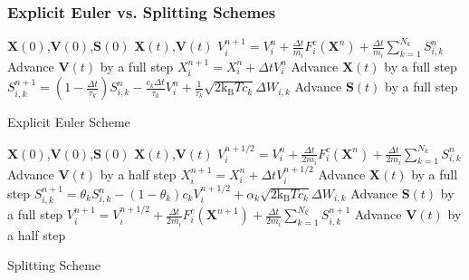 \documentclass[a4paper,10pt]{beamer}
\newcommand{\BS}[1]{\boldsymbol{#1}}
\newcommand{\rb}[1]{\left( #1 \right)}
\begin{document}
	\begin{frame}
		\frametitle{Explicit Euler vs. Splitting Schemes}
			\vspace{-0.3cm}
			\begin{algorithm}[H]
				\scriptsize
				\renewcommand{\algorithmicrequire}{\textbf{Input:}}
				\renewcommand{\algorithmicensure}{\textbf{Output:}}
				\begin{algorithmic}[1]
					\Require $\BS{X}(0)$,$\BS{V}(0)$,$\BS{S}(0)$
					\Ensure $\BS{X}(t)$,$\BS{V}(t)$
					\tiny
						\State $V_{i}^{n+1} = V_{i}^{n} + \frac{\Delta t}{m_{i}} F_{i}^{c} \rb{\BS{X}^{n}}+\frac{\Delta t}{m_{i}} \sum_{k=1}^{N_{k}}S_{i,k}^{n}$
						\Comment Advance $\BS{V}(t)$ by a full step
						\State $X_{i}^{n+1} = X_{i}^{n} + \Delta t V_{i}^{n}$
						\Comment Advance $\BS{X}(t)$ by a full step
						\State $S_{i,k}^{n+1} = \rb{1-\frac{\Delta t}{\tau_{k}}}S_{i,k}^{n}-\frac{c_{k}\Delta t}{\tau_{k}}V_{i}^{n} + \frac{1}{\tau_{k}}\sqrt{2 \text{k}_{\text{B}} T c_{k}}\Delta W_{i,k}$
						\Comment Advance $\BS{S}(t)$ by a full step
					\scriptsize
					\EndFor
				\end{algorithmic}
				\caption*{Explicit Euler Scheme}
			\end{algorithm}
			\vspace{-0.75cm}
			\begin{algorithm}[H]
				\scriptsize
				\renewcommand{\algorithmicrequire}{\textbf{Input:}}
				\renewcommand{\algorithmicensure}{\textbf{Output:}}
				\begin{algorithmic}[1]
					\Require $\BS{X}(0)$,$\BS{V}(0)$,$\BS{S}(0)$
					\Ensure $\BS{X}(t)$,$\BS{V}(t)$
					\tiny
					\State $V_{i}^{n+1/2} = V_{i}^{n} + \frac{\Delta t}{2m_{i}} F_{i}^{c} \rb{\BS{X}^{n}}+\frac{\Delta t}{2m_{i}} \sum_{k=1}^{N_{k}}S_{i,k}^{n}$
					\Comment Advance $\BS{V}(t)$ by a half step
					\State $X_{i}^{n+1} = X_{i}^{n} + \Delta t V_{i}^{n+1/2}$
					\Comment Advance $\BS{X}(t)$ by a full step
					\State $S_{i,k}^{n+1} = \theta_{k} S_{i,k}^{n}-\rb{1-\theta_{k}}c_{k}V_{i}^{n+1/2} + \alpha_{k}\sqrt{2 \text{k}_{\text{B}} T c_{k}}\Delta W_{i,k}$
					\Comment Advance $\BS{S}(t)$ by a full step
					\State $V_{i}^{n+1} = V_{i}^{n+1/2} + \frac{\Delta t}{2m_{i}} F_{i}^{c} \rb{\BS{X}^{n+1}}+\frac{\Delta t}{2m_{i}} \sum_{k=1}^{N_{k}}S_{i,k}^{n+1}$
					\Comment Advance $\BS{V}(t)$ by a half step
					\scriptsize
					\EndFor
				\end{algorithmic}
				\caption*{Splitting Scheme}
			\end{algorithm}
	\end{frame}
\end{document}
